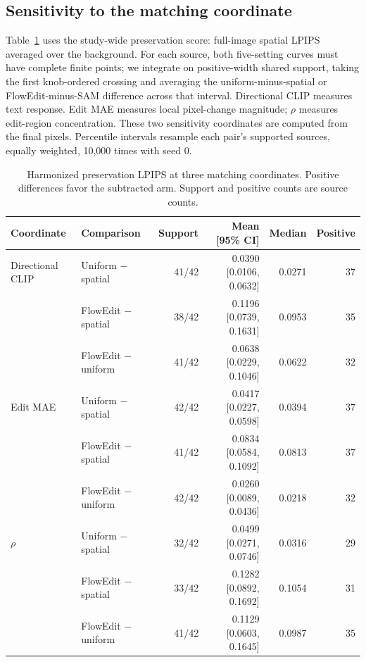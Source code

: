 \subsection{Sensitivity to the matching coordinate}
Table~\ref{tab:v19-pixel-mrc} uses the study-wide preservation score: full-image spatial LPIPS averaged over the background. For each source, both five-setting curves must have complete finite points; we integrate on positive-width shared support, taking the first knob-ordered crossing and averaging the uniform-minus-spatial or FlowEdit-minus-SAM difference across that interval. Directional CLIP measures text response. Edit MAE measures local pixel-change magnitude; $\rho$ measures edit-region concentration. These two sensitivity coordinates are computed from the final pixels. Percentile intervals resample each pair's supported sources, equally weighted, 10,000 times with seed 0.

\begin{table}[t]\centering\small
\caption{Harmonized preservation LPIPS at three matching coordinates. Positive differences favor the subtracted arm. Support and positive counts are source counts.}
\label{tab:v19-pixel-mrc}
\setlength{\tabcolsep}{5pt}
\begin{tabular}{llrrrr}
\toprule Coordinate & Comparison & Support & Mean [95\% CI] & Median & Positive\\\midrule
Directional CLIP & Uniform $-$ spatial & 41/42 & 0.0390 [0.0106, 0.0632] & 0.0271 & 37 \\
 & FlowEdit $-$ spatial & 38/42 & 0.1196 [0.0739, 0.1631] & 0.0953 & 35 \\
 & FlowEdit $-$ uniform & 41/42 & 0.0638 [0.0229, 0.1046] & 0.0622 & 32 \\
\midrule
Edit MAE & Uniform $-$ spatial & 42/42 & 0.0417 [0.0227, 0.0598] & 0.0394 & 37 \\
 & FlowEdit $-$ spatial & 41/42 & 0.0834 [0.0584, 0.1092] & 0.0813 & 37 \\
 & FlowEdit $-$ uniform & 42/42 & 0.0260 [0.0089, 0.0436] & 0.0218 & 32 \\
\midrule
$\rho$ & Uniform $-$ spatial & 32/42 & 0.0499 [0.0271, 0.0746] & 0.0316 & 29 \\
 & FlowEdit $-$ spatial & 33/42 & 0.1282 [0.0892, 0.1692] & 0.1054 & 31 \\
 & FlowEdit $-$ uniform & 41/42 & 0.1129 [0.0603, 0.1645] & 0.0987 & 35 \\
\bottomrule\end{tabular}\end{table}

